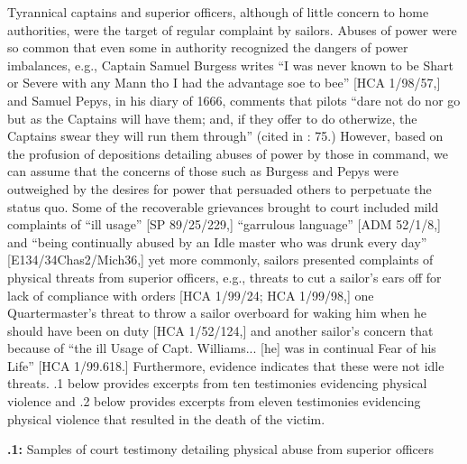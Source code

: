 Tyrannical captains and superior officers, although of little concern to home authorities, were the target of regular complaint by sailors. Abuses of power were so common that even some in authority recognized the dangers of power imbalances, e.g., Captain Samuel Burgess writes “I was never known to be Shart or Severe with any Mann tho I had the advantage soe to bee” [HCA 1/98/57,] and Samuel Pepys, in his diary of 1666, comments that pilots “dare not do nor go but as the Captains will have them; and, if they offer to do otherwize, the Captains swear they will run them through” (cited in \citealt{Lavery2009}: 75.) However, based on the profusion of depositions detailing abuses of power by those in command, we can assume that the concerns of those such as Burgess and Pepys were outweighed by the desires for power that persuaded others to perpetuate the status quo. Some of the recoverable grievances brought to court included mild complaints of “ill usage” [SP 89/25/229,] “garrulous language” [ADM 52/1/8,] and “being continually abused by an Idle master who was drunk every day” [E134/34Chas2/Mich36,] yet more commonly, sailors presented complaints of physical threats from superior officers, e.g., threats to cut a sailor’s ears off for lack of compliance with orders [HCA 1/99/24; HCA 1/99/98,] one Quartermaster’s threat to throw a sailor overboard for waking him when he should have been on duty [HCA 1/52/124,] and another sailor’s concern that because of “the ill Usage of Capt. Williams... [he] was in continual Fear of his Life” [HCA 1/99.618.] Furthermore, evidence indicates that these were not idle threats. .1 below provides excerpts from ten testimonies evidencing physical violence and .2 below provides excerpts from eleven testimonies evidencing physical violence that resulted in the death of the victim.

\textbf{.1:} Samples of court testimony detailing physical abuse from superior officers

\tablefirsthead{}

